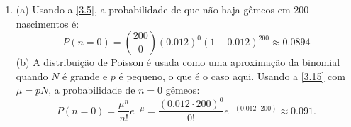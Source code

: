 \begin{enumerate}[label=\textbf{3.\arabic*.}]
	\item (a) Usando a \autoref{3.5}, a probabilidade de que não haja gêmeos em 200 nascimentos é:
	\begin{equation*}
	P(n = 0) =  \binom{200}{0} (0.012)^0 (1 - 0.012)^{200} \approx 0.0894
	\end{equation*}
	(b) A distribuição de Poisson é usada como uma aproximação da binomial quando $N$ é grande e $p$ é pequeno, o que é o caso aqui. Usando a \autoref{3.15} com $\mu = pN$, a probabilidade de $n = 0$ gêmeos:
	\begin{equation*}
	P(n = 0) = \dfrac{\mu^n}{n!}e^{- \mu} = \dfrac{(0.012 \cdot 200)^0}{0!}e^{-(0.012 \cdot 200)} \approx 0.091.
	\end{equation*}
\end{enumerate}